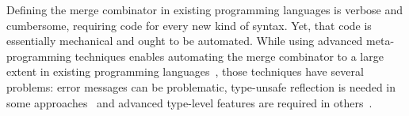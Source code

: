 
Defining the merge combinator in existing
programming languages is verbose and cumbersome, requiring code for every
new kind of syntax. Yet, that code is essentially mechanical and ought to be
automated. While using advanced meta-programming techniques enables automating
the merge combinator to a large extent in existing programming
languages~\cite{oliveira2013feature, rendel14attributes}, those techniques have
several problems: error messages can be problematic, type-unsafe reflection
is needed in some approaches~\cite{oliveira2013feature} and
advanced type-level features are required in others~\cite{rendel14attributes}.

